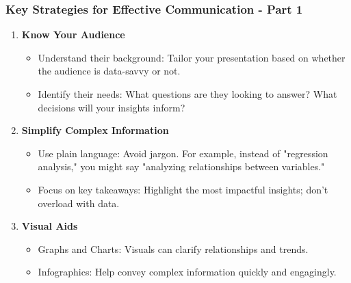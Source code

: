 \documentclass{beamer}
\begin{document}
\begin{frame}[fragile]
    \frametitle{Key Strategies for Effective Communication - Part 1}
    \begin{enumerate}
        \item \textbf{Know Your Audience}
        \begin{itemize}
            \item Understand their background: Tailor your presentation based on whether the audience is data-savvy or not.
            \item Identify their needs: What questions are they looking to answer? What decisions will your insights inform?
        \end{itemize}
        
        \item \textbf{Simplify Complex Information}
        \begin{itemize}
            \item Use plain language: Avoid jargon. For example, instead of "regression analysis," you might say "analyzing relationships between variables."
            \item Focus on key takeaways: Highlight the most impactful insights; don’t overload with data.
        \end{itemize}

        \item \textbf{Visual Aids}
        \begin{itemize}
            \item Graphs and Charts: Visuals can clarify relationships and trends.
            \item Infographics: Help convey complex information quickly and engagingly.
        \end{itemize}
    \end{enumerate}
\end{frame}
\end{document}

